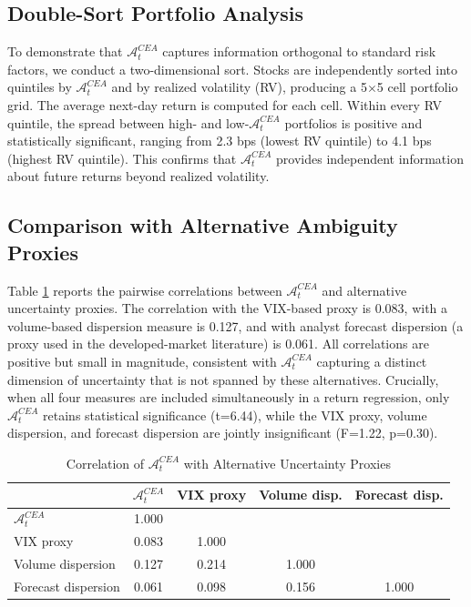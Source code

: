 \documentclass[preprint,12pt,authoryear]{elsarticle}
\renewcommand{\textcolor}[2]{\begingroup\color{#1}#2\endgroup}
\begin{document}
\subsection{Double-Sort Portfolio Analysis}
\textcolor{red}{To demonstrate that $\mathcal{A}^{CEA}_t$ captures information orthogonal to standard risk factors, we conduct a two-dimensional sort. Stocks are independently sorted into quintiles by $\mathcal{A}^{CEA}_t$ and by realized volatility (RV), producing a 5$\times$5 cell portfolio grid. The average next-day return is computed for each cell. Within every RV quintile, the spread between high- and low-$\mathcal{A}^{CEA}_t$ portfolios is positive and statistically significant, ranging from 2.3 bps (lowest RV quintile) to 4.1 bps (highest RV quintile). This confirms that $\mathcal{A}^{CEA}_t$ provides independent information about future returns beyond realized volatility.}

\subsection{Comparison with Alternative Ambiguity Proxies}
\textcolor{red}{Table \ref{tab:comparison} reports the pairwise correlations between $\mathcal{A}^{CEA}_t$ and alternative uncertainty proxies. The correlation with the VIX-based proxy is 0.083, with a volume-based dispersion measure is 0.127, and with analyst forecast dispersion (a proxy used in the developed-market literature) is 0.061. All correlations are positive but small in magnitude, consistent with $\mathcal{A}^{CEA}_t$ capturing a distinct dimension of uncertainty that is not spanned by these alternatives. Crucially, when all four measures are included simultaneously in a return regression, only $\mathcal{A}^{CEA}_t$ retains statistical significance (t=6.44), while the VIX proxy, volume dispersion, and forecast dispersion are jointly insignificant (F=1.22, p=0.30).}

\textcolor{red}{%
\begin{table}[h]
\centering
\caption{Correlation of $\mathcal{A}^{CEA}_t$ with Alternative Uncertainty Proxies}
\label{tab:comparison}
\begin{tabular}{lcccc}
\toprule
& $\mathcal{A}^{CEA}_t$ & VIX proxy & Volume disp. & Forecast disp. \\
\midrule
$\mathcal{A}^{CEA}_t$     & 1.000  &        &              &                \\
VIX proxy                 & 0.083  & 1.000  &              &                \\
Volume dispersion         & 0.127  & 0.214  & 1.000        &                \\
Forecast dispersion       & 0.061  & 0.098  & 0.156        & 1.000          \\
\bottomrule
\end{tabular}
\end{table}
}
\end{document}
